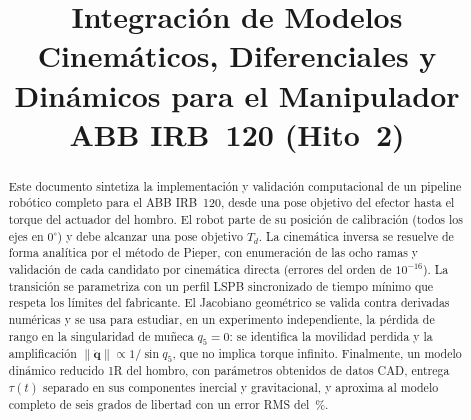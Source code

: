 \documentclass[conference]{IEEEtran}
\begin{document}
\title{Integración de Modelos Cinemáticos, Diferenciales y Dinámicos para el Manipulador ABB IRB~120 (Hito~2)}

\author{
    \and
    \and
}

\maketitle

\begin{abstract}
Este documento sintetiza la implementación y validación computacional de un pipeline robótico completo para el
ABB IRB~120, desde una pose objetivo del efector hasta el torque del actuador del hombro. El robot parte de su posición
de calibración (todos los ejes en $0^\circ$) y debe alcanzar una pose objetivo $T_d$. La cinemática inversa se resuelve
de forma analítica por el método de Pieper, con enumeración de las ocho ramas y validación de cada candidato por
cinemática directa (errores del orden de $10^{-16}$). La transición se parametriza con un perfil LSPB sincronizado de
tiempo mínimo que respeta los límites del fabricante. El Jacobiano geométrico se valida contra derivadas numéricas y se
usa para estudiar, en un experimento independiente, la pérdida de rango en la singularidad de muñeca $q_5 = 0$: se
identifica la movilidad perdida y la amplificación $\lVert\dot{\mathbf{q}}\rVert \propto 1/\sin q_5$, que no implica
torque infinito. Finalmente, un modelo dinámico reducido 1R del hombro, con parámetros obtenidos de datos CAD, entrega
$\tau(t)$ separado en sus componentes inercial y gravitacional, y aproxima al modelo completo de seis grados de
libertad con un error RMS del \RMSPct\,\%.
\end{abstract}
\end{document}
